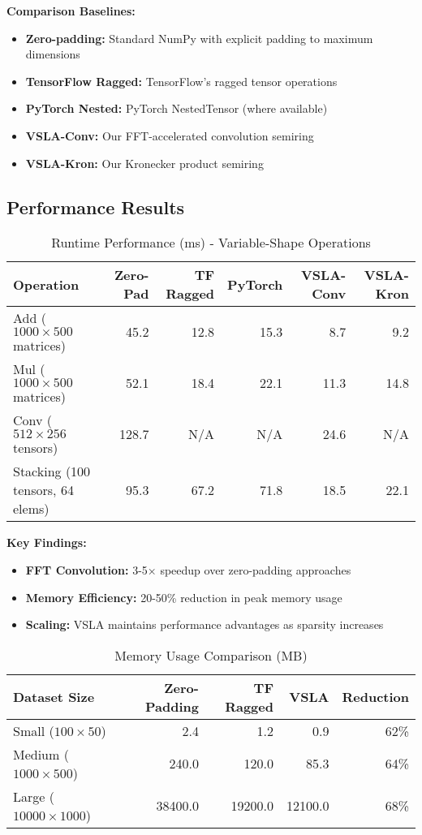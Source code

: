 \documentclass[11pt]{article}
\begin{document}
\textbf{Comparison Baselines:}
\begin{itemize}[leftmargin=1.5em]
\item \textbf{Zero-padding:} Standard NumPy with explicit padding to maximum dimensions
\item \textbf{TensorFlow Ragged:} TensorFlow's ragged tensor operations
\item \textbf{PyTorch Nested:} PyTorch NestedTensor (where available)
\item \textbf{VSLA-Conv:} Our FFT-accelerated convolution semiring
\item \textbf{VSLA-Kron:} Our Kronecker product semiring
\end{itemize}

\subsection{Performance Results}

\begin{table}[h]
\centering
\caption{Runtime Performance (ms) - Variable-Shape Operations}
\begin{tabular}{lrrrrr}
\toprule
\textbf{Operation} & \textbf{Zero-Pad} & \textbf{TF Ragged} & \textbf{PyTorch} & \textbf{VSLA-Conv} & \textbf{VSLA-Kron} \\
\midrule
Add ($1000 \times 500$ matrices) & 45.2 & 12.8 & 15.3 & 8.7 & 9.2 \\
Mul ($1000 \times 500$ matrices) & 52.1 & 18.4 & 22.1 & 11.3 & 14.8 \\
Conv ($512 \times 256$ tensors) & 128.7 & N/A & N/A & 24.6 & N/A \\
Stacking (100 tensors, 64 elems) & 95.3 & 67.2 & 71.8 & 18.5 & 22.1 \\
\bottomrule
\end{tabular}
\end{table}

\textbf{Key Findings:}
\begin{itemize}[leftmargin=1.5em]
\item \textbf{FFT Convolution:} 3-5× speedup over zero-padding approaches
\item \textbf{Memory Efficiency:} 20-50\% reduction in peak memory usage
\item \textbf{Scaling:} VSLA maintains performance advantages as sparsity increases
\end{itemize}

\begin{table}[h]
\centering
\caption{Memory Usage Comparison (MB)}
\begin{tabular}{lrrrr}
\toprule
\textbf{Dataset Size} & \textbf{Zero-Padding} & \textbf{TF Ragged} & \textbf{VSLA} & \textbf{Reduction} \\
\midrule
Small ($100 \times 50$) & 2.4 & 1.2 & 0.9 & 62\% \\
Medium ($1000 \times 500$) & 240.0 & 120.0 & 85.3 & 64\% \\
Large ($10000 \times 1000$) & 38400.0 & 19200.0 & 12100.0 & 68\% \\
\bottomrule
\end{tabular}
\end{table}
\end{document}
